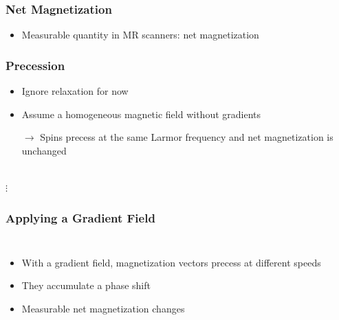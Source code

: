 \begin{frame}
	\frametitle{Net Magnetization}
	
	\begin{itemize}
		\item Measurable quantity in MR scanners: net magnetization
	\end{itemize}
	
	\begin{center}
		\begingroup
		
		\endgroup
	\end{center}
	
\end{frame}

\begin{frame}
	\frametitle{Precession}
	
	\begin{itemize}
		\item Ignore relaxation for now
		\item Assume a homogeneous magnetic field without gradients
		\item[$\rightarrow$] Spins precess at the same Larmor frequency and net magnetization is unchanged
	\end{itemize}
	
	\begin{center}
		\begingroup
		 \\
		$\vdots$
		\endgroup
	\end{center}
\end{frame}

\begin{frame}
	\frametitle{Applying a Gradient Field}
	
	\begin{columns}[onlytextwidth,c]
		\begin{itemize}
			\item With a gradient field, magnetization vectors precess at different speeds
			\item They accumulate a phase shift
			\item Measurable net magnetization changes
		\end{itemize}
	\end{columns}
	
	
	
	\begin{center}
		\begingroup
		
		\endgroup
	\end{center}
	
\end{frame}

